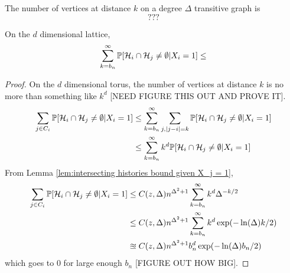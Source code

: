 \begin{lemma}
	The number of vertices at distance $k$ on a degree $\Delta$ transitive graph is
	\begin{equation}
		???
	\end{equation}
\end{lemma}
\begin{lemma}
	On the $d$ dimensional lattice,
	\begin{equation}
		\sum_{k = b_n}^\infty \mathbb{P}[\mathcal{H}_{i} \cap \mathcal{H}_j \neq \emptyset | X_i = 1] \leq 
	\end{equation}
\end{lemma}
\begin{proof}
	On the $d$ dimensional torus, the number of vertices at distance $k$ is no more than something like $k^d$ [NEED FIGURE THIS OUT AND PROVE IT].
	\begin{align}
		\sum_{j \in C_i} \mathbb{P}[\mathcal{H}_{i} \cap \mathcal{H}_j \neq \emptyset | X_i = 1] &\leq \sum_{k = b_n}^\infty \sum_{j, |j - i| = k} \mathbb{P}[\mathcal{H}_{i} \cap \mathcal{H}_j \neq \emptyset | X_i = 1] \\
		&\leq \sum_{k = b_n}^\infty k^d \mathbb{P}[\mathcal{H}_{i} \cap \mathcal{H}_j \neq \emptyset | X_i = 1]
	\end{align}
	From Lemma \ref{lem:intersecting histories bound given X_j = 1},
	\begin{align}
		\sum_{j \in C_i} \mathbb{P}[\mathcal{H}_{i} \cap \mathcal{H}_j \neq \emptyset | X_i = 1] &\leq C(z, \Delta) n^{\Delta^2 + 1} \sum_{k = b_n}^\infty k^d \Delta^{-k/2} \\
		&\leq C(z, \Delta) n^{\Delta^2 + 1} \sum_{k = b_n}^\infty k^d \exp(-\ln(\Delta) k/2)\\
		&\approxeq C(z, \Delta) n^{\Delta^2 + 1} b_n^d \exp(-\ln(\Delta)b_n/2)
	\end{align}
	which goes to 0 for large enough $b_n$ [FIGURE OUT HOW BIG].
\end{proof}

